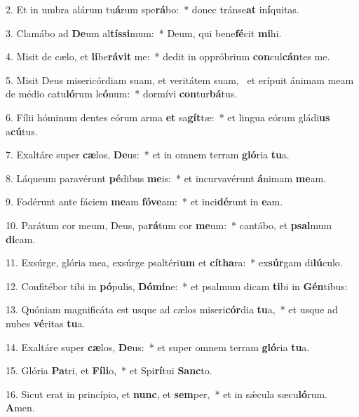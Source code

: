 2. Et in umbra alárum tu\textbf{á}rum spe\textbf{rá}bo:~*  donec tránse\textbf{at} in\textbf{í}quitas.\

3. Clamábo ad \textbf{De}um al\textbf{tís}\textbf{si}mum:~*  Deum, qui bene\textbf{fé}cit \textbf{mi}hi.\

4. Misit de cælo, et \textbf{li}be\textbf{rá}\textbf{vit} me:~*  dedit in oppróbrium \textbf{con}cul\textbf{cán}tes me.\

5. Misit Deus misericórdiam suam, et veritátem suam, \dag\  et erípuit ánimam meam de médio catu\textbf{ló}rum le\textbf{ó}num:~*  dormívi \textbf{con}tur\textbf{bá}tus.\

6. Fílii hóminum dentes eórum arma \textbf{et} sa\textbf{gít}tæ:~*  et lingua eórum gládi\textbf{us} a\textbf{cú}tus.\

7. Exaltáre super \textbf{cæ}los, \textbf{De}us:~*  et in omnem terram \textbf{gló}ria \textbf{tu}a.\

8. Láqueum paravérunt \textbf{pé}dibus \textbf{me}is:~*  et incurvavérunt \textbf{á}nimam \textbf{me}am.\

9. Fodérunt ante fáciem \textbf{me}am \textbf{fó}\textbf{ve}am:~*  et inci\textbf{dé}runt in \textbf{e}am.\

10. Parátum cor meum, Deus, pa\textbf{rá}tum cor \textbf{me}um:~*  cantábo, et \textbf{psal}mum \textbf{di}cam.\

11. Exsúrge, glória mea, exsúrge psaltéri\textbf{um} et \textbf{cí}\textbf{tha}ra:~*  ex\textbf{súr}gam di\textbf{lú}culo.\

12. Confitébor tibi in \textbf{pó}pulis, \textbf{Dó}\textbf{mi}ne:~*  et psalmum dicam \textbf{ti}bi in \textbf{Gén}tibus:\

13. Quóniam magnificáta est usque ad cælos miseri\textbf{cór}dia \textbf{tu}a,~*  et usque ad nubes \textbf{vé}ritas \textbf{tu}a.\

14. Exaltáre super \textbf{cæ}los, \textbf{De}us:~*  et super omnem terram \textbf{gló}ria \textbf{tu}a.\

15. Glória \textbf{Pa}tri, et \textbf{Fí}\textbf{li}o,~*  et Spi\textbf{rí}tui \textbf{Sanc}to.\

16. Sicut erat in princípio, et \textbf{nunc}, et \textbf{sem}per,~*  et in sǽcula sæcu\textbf{ló}rum. \textbf{A}men.\

